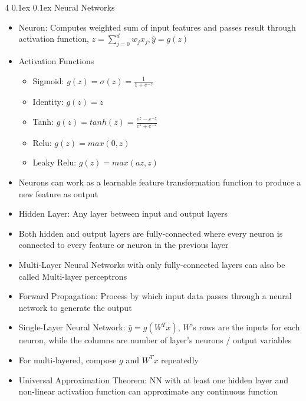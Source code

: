 \documentclass[10pt, landscape]{article}
\makeatletter
\renewcommand{\section}{\@startsection{section}{1}{0mm}%
  {0.1ex} %
  {0.1ex} %
  {\normalfont\large\bfseries}}
\makeatother
\begin{document}
\begin{multicols*}{4}
\section{Neural Networks}
\begin{itemize}
    \item Neuron: Computes weighted sum of input features and passes result through activation function, $z=\sum_{j=0}^dw_jx_j, \hat{y}=g(z)$
    \item Activation Functions
    \begin{itemize}
        \item Sigmoid: $g(z)=\sigma(z)=\frac{1}{1+e^{-z}}$
        \item Identity: $g(z)=z$
        \item Tanh: $g(z)=tanh(z)=\frac{e^z-e^{-z}}{e^z+e^{-z}}$
        \item Relu: $g(z)=max(0, z)$
        \item Leaky Relu: $g(z)=max(az, z)$
    \end{itemize}
    \item Neurons can work as a learnable feature transformation function to produce a new feature as output
    \item Hidden Layer: Any layer between input and output layers
    \item Both hidden and output layers are fully-connected where every neuron is connected to every feature or neuron in the previous layer
    \item Multi-Layer Neural Networks with only fully-connected layers can also be called Multi-layer perceptrons
    \item Forward Propagation: Process by which input data passes through a neural network to generate the output
    \item Single-Layer Neural Network: $\hat{y}=g(W^Tx)$, $W$'s rows are the inputs for each neuron, while the columns are number of layer's neurons / output variables
    \item For multi-layered, compose $g$ and $W^Tx$ repeatedly
    \item Universal Approximation Theorem: NN with at least one hidden layer and non-linear activation function can approximate any continuous function
\end{itemize}


\end{multicols*}
\end{document}
